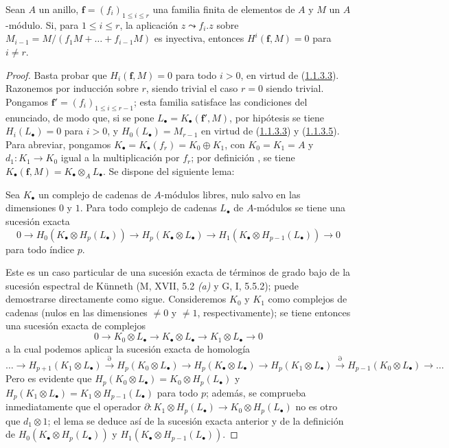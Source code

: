\begin{proposition}[1.1.4]
\label{III.1.1.4}
\label{III.1.1.4-fr}
Sean $A$ un anillo, $\mathbf f=(f_i)_{1\leq i\leq r}$ una familia finita de elementos de $A$ y $M$ un $A$-módulo.
Si, para $1\leq i\leq r$, la aplicación $z\leadsto f_i.z$ sobre $M_{i-1}=M/(f_1M+\ldots+f_{i-1}M)$ es inyectiva, entonces $H^i(\mathbf f,M)=0$ para $i\neq r$.
\end{proposition}

\begin{proof}
Basta probar que $H_i(\mathbf f,M)=0$ para todo $i>0$, en virtud de (\hyperref[III.1.1.3.3]{1.1.3.3}).
Razonemos por inducción sobre $r$, siendo trivial el caso $r=0$ siendo trivial. Pongamos $\mathbf f'=(f_i)_{1\leq i\leq r-1}$; esta familia satisface las condiciones del enunciado, de modo que, si se pone $L_\bullet=K_\bullet(\mathbf f',M)$, por hipótesis se tiene $H_i(L_\bullet)=0$ para $i>0$, y $H_0(L_\bullet)=M_{r-1}$ en virtud de (\hyperref[III.1.1.3.3]{1.1.3.3}) y (\hyperref[III.1.1.3.5]{1.1.3.5}).
Para abreviar, pongamos $K_\bullet=K_\bullet(f_r)=K_0\oplus K_1$, con $K_0=K_1=A$ y $d_1:K_1\to K_0$ igual a la multiplicación por $f_r$; por definición , se tiene $K_\bullet(\mathbf f,M)=K_\bullet\otimes_A L_\bullet$.
Se dispone del siguiente lema:

\begin{lemma}[1.1.4.1]
\label{III.1.1.4.1}
\label{III.1.1.4.1-fr}
Sea $K_\bullet$ un complejo de cadenas de $A$-módulos libres, nulo salvo en las dimensiones $0$ y $1$.
Para todo complejo de cadenas $L_\bullet$ de $A$-módulos se tiene una sucesión exacta
\[
0\longrightarrow H_0(K_\bullet\otimes H_p(L_\bullet))
\longrightarrow H_p(K_\bullet\otimes L_\bullet)
\longrightarrow H_1(K_\bullet\otimes H_{p-1}(L_\bullet))
\longrightarrow0
\]
para todo índice $p$.
\end{lemma}

Este es un caso particular de una sucesión exacta de términos de grado bajo de la sucesión espectral de K\"unneth (M, XVII, 5.2 \emph{(a)} y G, I, 5.5.2); puede demostrarse directamente como sigue.
Consideremos $K_0$ y $K_1$ como complejos de cadenas (nulos en las dimensiones $\neq0$ y $\neq1$, respectivamente); se tiene entonces una sucesión exacta de complejos
\[
0\longrightarrow K_0\otimes L_\bullet
\longrightarrow K_\bullet\otimes L_\bullet
\longrightarrow K_1\otimes L_\bullet\longrightarrow0
\] a la cual podemos aplicar la sucesión exacta de homología \[
\ldots\longrightarrow H_{p+1}(K_1\otimes L_\bullet)
\xrightarrow{\partial}H_p(K_0\otimes L_\bullet)
\longrightarrow H_p(K_\bullet\otimes L_\bullet)
\longrightarrow H_p(K_1\otimes L_\bullet)
\xrightarrow{\partial}H_{p-1}(K_0\otimes L_\bullet)
\longrightarrow\ldots
\]
Pero es evidente que $H_p(K_0\otimes L_\bullet)=K_0\otimes H_p(L_\bullet)$ y $H_p(K_1\otimes L_\bullet)=K_1\otimes H_{p-1}(L_\bullet)$ para todo $p$; además, se comprueba inmediatamente que el operador $\partial:K_1\otimes H_p(L_\bullet)\to K_0\otimes H_p(L_\bullet)$ no es otro que $d_1\otimes1$; el lema se deduce así de la sucesión exacta anterior y de la definición de $H_0(K_\bullet\otimes H_p(L_\bullet))$ y $H_1(K_\bullet\otimes H_{p-1}(L_\bullet))$.


\end{proof}
